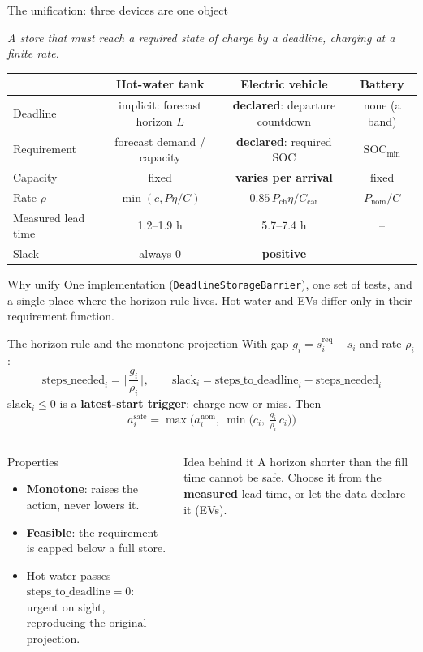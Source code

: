 \documentclass[aspectratio=169,10pt]{beamer}
\newcommand{\SOC}{\mathrm{SOC}}
\begin{document}
\begin{frame}{The unification: three devices are one object}
\begin{center}
\large \emph{A store that must reach a required state of charge by a deadline, charging at a finite rate.}
\end{center}
\small
\begin{tabular}{@{}lccc@{}}
\toprule
 & Hot-water tank & Electric vehicle & Battery \\
\midrule
Deadline & implicit: forecast horizon $L$ & \textbf{declared}: departure countdown & none (a band) \\
Requirement & forecast demand / capacity & \textbf{declared}: required SOC & $\SOC_{\min}$ \\
Capacity & fixed & \textbf{varies per arrival} & fixed \\
Rate $\rho$ & $\min(c, P\eta/C)$ & $0.85\,P_{\text{ch}}\eta/C_{\text{car}}$ & $P_{\text{nom}}/C$ \\
Measured lead time & 1.2--1.9 h & 5.7--7.4 h & -- \\
Slack & always 0 & \textbf{positive} & -- \\
\bottomrule
\end{tabular}
\vspace{0.5em}
\begin{block}{Why unify}
One implementation (\texttt{DeadlineStorageBarrier}), one set of tests, and a single place where the horizon rule lives. Hot water and EVs differ only in their requirement function.
\end{block}
\end{frame}

\begin{frame}{The horizon rule and the monotone projection}
\small
With gap $g_i = s^{\text{req}}_i - s_i$ and rate $\rho_i$:
\[
\text{steps\_needed}_i = \Big\lceil \frac{g_i}{\rho_i} \Big\rceil,
\qquad
\text{slack}_i = \text{steps\_to\_deadline}_i - \text{steps\_needed}_i
\]
$\text{slack}_i \le 0$ is a \textbf{latest-start trigger}: charge now or miss. Then
\[
a^{\text{safe}}_i = \max\Big(a^{\text{nom}}_i,\ \min\big(c_i,\ \tfrac{g_i}{\rho_i}\,c_i\big)\Big)
\]
\begin{columns}[T]
\begin{block}{Properties}
\begin{itemize}
  \item \textbf{Monotone}: raises the action, never lowers it.
  \item \textbf{Feasible}: the requirement is capped below a full store.
  \item Hot water passes $\text{steps\_to\_deadline} = 0$: urgent on sight, reproducing the original projection.
\end{itemize}
\end{block}
\begin{block}{Idea behind it}
A horizon shorter than the fill time cannot be safe. Choose it from the \textbf{measured} lead time, or let the data declare it (EVs).
\end{block}
\end{columns}
\end{frame}
\end{document}
